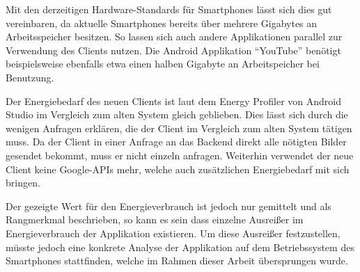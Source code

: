 Mit den derzeitigen Hardware-Standards für Smartphones lässt sich dies gut vereinbaren, da aktuelle Smartphones bereits über mehrere Gigabytes an Arbeitsspeicher besitzen.
So lassen sich auch andere Applikationen parallel zur Verwendung des Clients nutzen.
Die Android Applikation "`YouTube"' benötigt beispielsweise ebenfalls etwa einen halben Gigabyte an Arbeitspeicher bei Benutzung.

Der Energiebedarf des neuen Clients ist laut dem Energy Profiler von Android Studio im Vergleich zum alten System gleich geblieben.
Dies lässt sich durch die wenigen Anfragen erklären, die der Client im Vergleich zum alten System tätigen muss.
Da der Client in einer Anfrage an das Backend direkt alle nötigten Bilder gesendet bekommt, muss er nicht einzeln anfragen.
Weiterhin verwendet der neue Client keine Google-APIs mehr, welche auch zusätzlichen Energiebedarf mit sich bringen.

Der gezeigte Wert für den Energieverbrauch ist jedoch nur gemittelt und als Rangmerkmal beschrieben, so kann es sein dass einzelne Ausreißer im Energieverbrauch der Applikation existieren. Um diese Ausreißer festzustellen, müsste jedoch eine konkrete Analyse der Applikation auf dem Betriebssystem des Smartphones stattfinden, welche im Rahmen dieser Arbeit übersprungen wurde.
